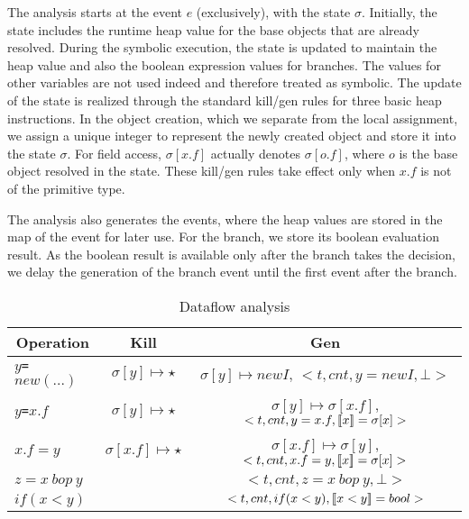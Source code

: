 The analysis starts at the event $e$ (exclusively), with the state $\sigma$.  Initially, the state includes the runtime heap value for the base objects that are already resolved. During the symbolic execution, the state is updated to maintain the heap value and also the boolean expression values for branches. The values for other variables are not used indeed and therefore treated as symbolic. The update of the state is realized through the   standard kill/gen rules for three basic heap instructions. In the object creation, which we separate from the local assignment, we assign a unique integer to represent the newly created object and store it into the state $\sigma$. For field access, $\sigma[x.f]$ actually denotes $\sigma[o.f]$, where  $o$ is the base object resolved in the state. 
These kill/gen rules take effect only when $x.f$  is not of the primitive type.

The analysis also generates the events, where the heap values are stored in the map of the event for later use. For the branch, we store its boolean evaluation result.
As the boolean result is available only after the branch takes the decision, we delay the generation of the branch event until the first event after the branch. 




\begin{table*}
\centering
\begin{tabular}{l|c|c}
\multicolumn{1}{c|}{Operation} & {Kill} & {Gen} \\
\hline
{\tt $y$=$new (...)$} 			&  $\sigma[y] \mapsto \star$		&  $\sigma[y] \mapsto newI$, $<t, cnt, y=newI, \bot>$\\
{\tt $y$=$x.f$} 			&   $\sigma[y]\mapsto \star$			&  $\sigma[y] \mapsto \sigma[x.f]$, $<t, cnt, y=x.f, \lbrack\!\lbrack x \rbrack\!\rbrack=\sigma[x]>$  \\
{\tt $x.f=y$} & $\sigma[x.f] \mapsto \star$		&  $\sigma[x.f] \mapsto \sigma[y]$, $<t, cnt, x.f=y, \lbrack\!\lbrack x \rbrack\!\rbrack=\sigma[x]>$ \\
{\tt $z=x\  bop\  y$} & 		&  $<t, cnt, z=x\  bop\  y, \bot>$ \\
{\tt $if(x<y)$} & 	  &  $<t, cnt, if(x<y), \lbrack\!\lbrack x<y \rbrack\!\rbrack=bool>$\\
\end{tabular}
\caption{\label{table:killgen}Dataflow analysis}
\end{table*}




